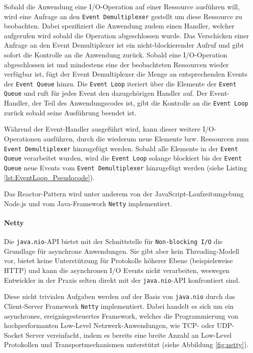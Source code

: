 Sobald die Anwendung eine I/O-Operation auf einer Ressource ausführen will, wird eine Anfrage an den
\verb|Event Demultiplexer| gestellt um diese Ressource zu beobachten.
Dabei spezifiziert die Anwendung zudem einen Handler, welcher aufgerufen wird sobald die Operation abgeschlossen wurde.
Das Verschicken einer Anfrage an den Event Demultiplexer ist ein nicht-blockierender Aufruf und gibt sofort die Kontrolle
an die Anwendung zurück.
Sobald eine I/O-Operation abgeschlossen ist und mindestens eine der beobachteten Ressourcen wieder verfügbar ist,
fügt der Event Demultiplexer die Menge an entsprechenden Events der \verb|Event Queue| hinzu.
Die \verb|Event Loop| iteriert über die Elemente der \verb|Event Queue| und ruft für jedes Event den dazugehörigen Handler auf.
Der Event-Handler, der Teil des Anwendungscodes ist, gibt die Kontrolle an die \verb|Event Loop| zurück sobald seine Ausführung
beendet ist.

Während der Event-Handler ausgeführt wird, kann dieser weitere I/O-Operationen ausführen, durch die wiederum
neue Elemente bzw. Ressourcen zum \verb|Event Demultiplexer| hinzugefügt werden.
Sobald alle Elemente in der \verb|Event Queue| verarbeitet wurden, wird die \verb|Event Loop| solange blockiert
bis der \verb|Event Queue| neue Events vom \verb|Event Demultiplexer| hinzugefügt werden (siehe Listing \ref{lst:EventLoop_Pseudocode}).
\parencite{SchmidtReactorPattern}

Das Reactor-Pattern wird unter anderem von der JavaScript-Laufzeitumgebung Node.js und vom Java-Framework \verb|Netty| implementiert.

\paragraph{Netty}

Die \verb|java.nio|-API bietet mit der Schnittstelle für \verb|Non-blocking I/O| die Grundlage für asynchrone Anwendungen.
Sie gibt aber kein Threading-Modell vor, bietet keine Unterstützung für Protokolle höherer Ebene (beispielsweise HTTP) und
kann die asynchronen I/O Events nicht verarbeiten, weswegen Entwickler in der Praxis selten direkt mit der \verb|java.nio|-API
konfrontiert sind.

Diese nicht trivialen Aufgaben werden auf der Basis von \verb|java.nio| durch das Client-Server Framework \verb|Netty| implementiert.
Dabei handelt es sich um ein asynchrones, ereignisgesteuertes Framework, welches
die Programmierung von hochperformanten Low-Level Netzwerk-Anwendungen, wie TCP- oder UDP-Socket Server vereinfacht, indem
es bereits eine breite Anzahl an Low-Level Protokollen und Transportmechanismen unterstützt (siehe Abbildung \ref{fig:netty}). \parencite{NettyUserAction}


